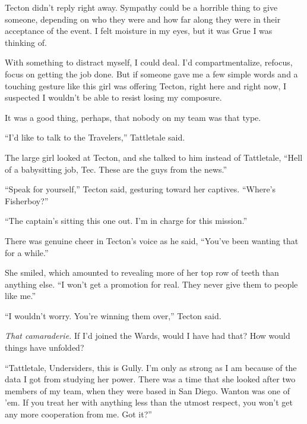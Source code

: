 Tecton didn't reply right away.  Sympathy could be a horrible thing to give someone, depending on who they were and how far along they were in their acceptance of the event.  I felt moisture in my eyes, but it was Grue I was thinking of.



With something to distract myself, I could deal.  I'd compartmentalize, refocus, focus on getting the job done.  But if someone gave me a few simple words and a touching gesture like this girl was offering Tecton, right here and right now, I suspected I wouldn't be able to resist losing my composure.



It was a good thing, perhaps, that nobody on my team was that type.



``I'd like to talk to the Travelers,'' Tattletale said.



The large girl looked at Tecton, and she talked to him instead of Tattletale, ``Hell of a babysitting job, Tec.  These are the guys from the news.''



``Speak for yourself,'' Tecton said, gesturing toward her captives.  ``Where's Fisherboy?''



``The captain's sitting this one out.  I'm in charge for this mission.''



There was genuine cheer in Tecton's voice as he said, ``You've been wanting that for a while.''



She smiled, which amounted to revealing more of her top row of teeth than anything else.  ``I won't get a promotion for real.  They never give them to people like me.''



``I wouldn't worry.  You're winning them over,'' Tecton said.



\emph{That camaraderie.  }If I'd joined the Wards, would I have had that?  How would things have unfolded?



``Tattletale, Undersiders, this is Gully.  I'm only as strong as I am because of the data I got from studying her power.  There was a time that she looked after two members of my team, when they were based in San Diego.  Wanton was one of 'em.  If you treat her with anything less than the utmost respect, you won't get any more cooperation from me.  Got it?''




